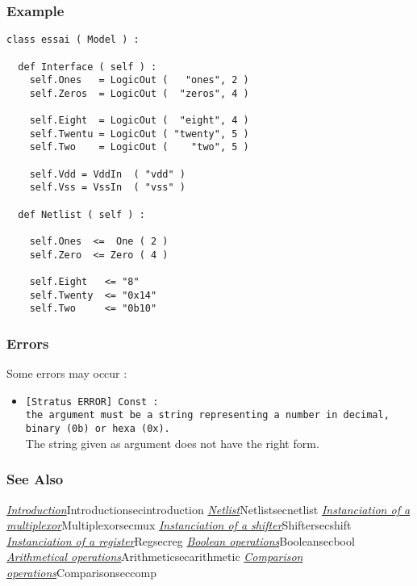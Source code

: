 \subsubsection{Example}

\begin{verbatim}
class essai ( Model ) :

  def Interface ( self ) :
    self.Ones   = LogicOut (   "ones", 2 )
    self.Zeros  = LogicOut (  "zeros", 4 )
    
    self.Eight  = LogicOut (  "eight", 4 )
    self.Twentu = LogicOut ( "twenty", 5 )
    self.Two    = LogicOut (    "two", 5 )

    self.Vdd = VddIn  ( "vdd" )
    self.Vss = VssIn  ( "vss" )
	
  def Netlist ( self ) :
    
    self.Ones  <=  One ( 2 )
    self.Zero  <= Zero ( 4 )
        
    self.Eight   <= "8"
    self.Twenty  <= "0x14"
    self.Two     <= "0b10"
\end{verbatim}
    
\subsubsection{Errors}
    
Some errors may occur :
\begin{itemize}
    \item \verb-[Stratus ERROR] Const :-\\\verb-the argument must be a string representing a number in decimal, binary (0b) or hexa (0x).-\\The string given as argument does not have the right form.
\end{itemize}

\subsubsection{See Also}

\hyperref[ref]{\emph{Introduction}}{}{Introduction}{secintroduction}
\hyperref[ref]{\emph{Netlist}}{}{Netlist}{secnetlist}
\hyperref[ref]{\emph{Instanciation of a multiplexor}}{}{Multiplexor}{secmux}
\hyperref[ref]{\emph{Instanciation of a shifter}}{}{Shifter}{secshift}
\hyperref[ref]{\emph{Instanciation of a register}}{}{Reg}{secreg}
\hyperref[ref]{\emph{Boolean operations}}{}{Boolean}{secbool}
\hyperref[ref]{\emph{Arithmetical operations}}{}{Arithmetic}{secarithmetic}
\hyperref[ref]{\emph{Comparison operations}}{}{Comparison}{seccomp}
